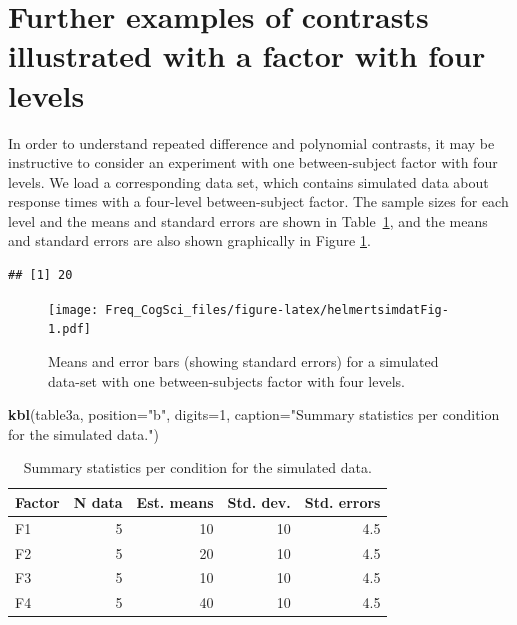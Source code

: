 \documentclass[12pt,]{krantz}
\newenvironment{Shaded}{\begin{snugshade}}{\end{snugshade}}
\newcommand{\DataTypeTok}[1]{\textcolor[rgb]{0.13,0.29,0.53}{#1}}
\newcommand{\DecValTok}[1]{\textcolor[rgb]{0.00,0.00,0.81}{#1}}
\newcommand{\KeywordTok}[1]{\textcolor[rgb]{0.13,0.29,0.53}{\textbf{#1}}}
\newcommand{\NormalTok}[1]{#1}
\newcommand{\StringTok}[1]{\textcolor[rgb]{0.31,0.60,0.02}{#1}}
\begin{document}
\hypertarget{sec:4levelFactor}{%
\section{Further examples of contrasts illustrated with a factor with four levels}\label{sec:4levelFactor}}

In order to understand repeated difference and polynomial contrasts, it may be instructive to consider an experiment with one between-subject factor with four levels.
We load a corresponding data set, which contains simulated data about response times with a four-level between-subject factor.
The sample sizes for each level and the means and standard errors are shown in Table~\ref{tab:cTab3Means}, and the means and standard errors are also shown graphically in Figure \ref{fig:helmertsimdatFig}.

\begin{verbatim}
## [1] 20
\end{verbatim}

\begin{figure}
\centering
\texttt{[image: Freq\_CogSci\_files/figure-latex/helmertsimdatFig-1.pdf]}
\caption{\label{fig:helmertsimdatFig}Means and error bars (showing standard errors) for a simulated data-set with one between-subjects factor with four levels.}
\end{figure}

\begin{Shaded}
\begin{Highlighting}[]
\KeywordTok{kbl}\NormalTok{(table3a, }\DataTypeTok{position=}\StringTok{"b"}\NormalTok{, }\DataTypeTok{digits=}\DecValTok{1}\NormalTok{, }
    \DataTypeTok{caption=}\StringTok{"Summary statistics per condition for the simulated data."}\NormalTok{)}
\end{Highlighting}
\end{Shaded}

\begin{table}[b]

\caption{\label{tab:cTab3Means}Summary statistics per condition for the simulated data.}
\centering
\begin{tabular}[t]{l|r|r|r|r}
\hline
Factor & N data & Est. means & Std. dev. & Std. errors\\
\hline
F1 & 5 & 10 & 10 & 4.5\\
\hline
F2 & 5 & 20 & 10 & 4.5\\
\hline
F3 & 5 & 10 & 10 & 4.5\\
\hline
F4 & 5 & 40 & 10 & 4.5\\
\hline
\end{tabular}
\end{table}
\end{document}

